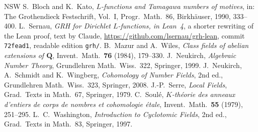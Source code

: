 \documentclass[reqno]{amsart}
\theoremstyle{definition}
\theoremstyle{plain}
\theoremstyle{remark}
\begin{document}
\begin{thebibliography}{NSW}
 S.~Bloch and K.~Kato, \emph{\(L\)-functions and Tamagawa numbers of motives}, in: The Grothendieck Festschrift, Vol.~I, Progr.\ Math.\ 86, Birkh\"auser, 1990, 333--400.
 L.~Sernau, \emph{GRH for Dirichlet \(L\)-functions, in Lean~4}, a shorter rewriting of the Lean proof, text by Claude, \url{https://github.com/lsernau/grh-lean}, commit \texttt{72fead1}, readable edition \texttt{grh/}.
 B.~Mazur and A.~Wiles, \emph{Class fields of abelian extensions of \(\mathbf{Q}\)}, Invent.\ Math.\ \textbf{76} (1984), 179--330.
 J.~Neukirch, \emph{Algebraic Number Theory}, Grundlehren Math.\ Wiss.\ 322, Springer, 1999.
 J.~Neukirch, A.~Schmidt and K.~Wingberg, \emph{Cohomology of Number Fields}, 2nd ed., Grundlehren Math.\ Wiss.\ 323, Springer, 2008.
 J.-P.~Serre, \emph{Local Fields}, Grad.\ Texts in Math.\ 67, Springer, 1979.
 C.~Soul\'e, \emph{\(K\)-th\'eorie des anneaux d'entiers de corps de nombres et cohomologie \'etale}, Invent.\ Math.\ \textbf{55} (1979), 251--295.
 L.~C.~Washington, \emph{Introduction to Cyclotomic Fields}, 2nd ed., Grad.\ Texts in Math.\ 83, Springer, 1997.
\end{thebibliography}
\end{document}
